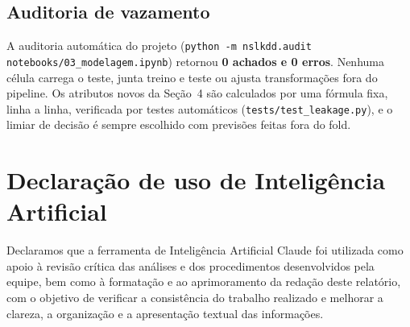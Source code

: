 \documentclass[11pt,a4paper]{article}
\begin{document}
\subsection*{Auditoria de vazamento}

A auditoria automática do projeto (\texttt{python -m nslkdd.audit notebooks/03\_modelagem.ipynb}) retornou \textbf{0 achados e 0 erros}. Nenhuma célula carrega o teste, junta treino e teste ou ajusta transformações fora do pipeline. Os atributos novos da Seção~4 são calculados por uma fórmula fixa, linha a linha, verificada por testes automáticos (\texttt{tests/test\_leakage.py}), e o limiar de decisão é sempre escolhido com previsões feitas fora do fold.

\section*{Declaração de uso de Inteligência Artificial}

Declaramos que a ferramenta de Inteligência Artificial Claude
foi utilizada como apoio à revisão crítica das análises e
dos procedimentos desenvolvidos pela equipe, bem como à
formatação e ao aprimoramento da redação deste relatório,
com o objetivo de verificar a consistência do trabalho
realizado e melhorar a clareza, a organização e a
apresentação textual das informações.
\end{document}

